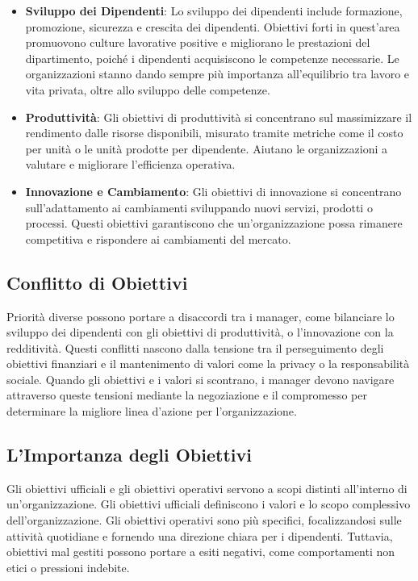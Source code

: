 \documentclass{article}
\begin{document}
\begin{itemize}
    \item \textbf{Sviluppo dei Dipendenti}: Lo sviluppo dei dipendenti include formazione, promozione, sicurezza e crescita dei dipendenti. Obiettivi forti in quest’area promuovono culture lavorative positive e migliorano le prestazioni del dipartimento, poiché i dipendenti acquisiscono le competenze necessarie. Le organizzazioni stanno dando sempre più importanza all’equilibrio tra lavoro e vita privata, oltre allo sviluppo delle competenze.
    
    \item \textbf{Produttività}: Gli obiettivi di produttività si concentrano sul massimizzare il rendimento dalle risorse disponibili, misurato tramite metriche come il costo per unità o le unità prodotte per dipendente. Aiutano le organizzazioni a valutare e migliorare l’efficienza operativa.
    
    \item \textbf{Innovazione e Cambiamento}: Gli obiettivi di innovazione si concentrano sull’adattamento ai cambiamenti sviluppando nuovi servizi, prodotti o processi. Questi obiettivi garantiscono che un’organizzazione possa rimanere competitiva e rispondere ai cambiamenti del mercato.
\end{itemize}


 
\subsection{Conflitto di Obiettivi}
Priorità diverse possono portare a disaccordi tra i manager, come bilanciare lo sviluppo dei dipendenti con gli obiettivi di produttività, o l'innovazione con la redditività. Questi conflitti nascono dalla tensione tra il perseguimento degli obiettivi finanziari e il mantenimento di valori come la privacy o la responsabilità sociale. Quando gli obiettivi e i valori si scontrano, i manager devono navigare attraverso queste tensioni mediante la negoziazione e il compromesso per determinare la migliore linea d'azione per l’organizzazione.

\subsection{L'Importanza degli Obiettivi}
Gli obiettivi ufficiali e gli obiettivi operativi servono a scopi distinti all’interno di un’organizzazione. Gli obiettivi ufficiali definiscono i valori e lo scopo complessivo dell’organizzazione. Gli obiettivi operativi sono più specifici, focalizzandosi sulle attività quotidiane e fornendo una direzione chiara per i dipendenti. Tuttavia, obiettivi mal gestiti possono portare a esiti negativi, come comportamenti non etici o pressioni indebite.
\end{document}
